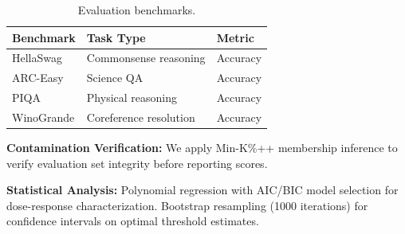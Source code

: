 \begin{table}[h]
\centering
\caption{Evaluation benchmarks.}
\label{tab:benchmarks}
\begin{tabular}{@{}lll@{}}
\toprule
Benchmark & Task Type & Metric \\
\midrule
HellaSwag & Commonsense reasoning & Accuracy \\
ARC-Easy & Science QA & Accuracy \\
PIQA & Physical reasoning & Accuracy \\
WinoGrande & Coreference resolution & Accuracy \\
\bottomrule
\end{tabular}
\end{table}

\textbf{Contamination Verification:} We apply Min-K\%++ \citep{shi2024minkpp} membership inference to verify evaluation set integrity before reporting scores.

\textbf{Statistical Analysis:} Polynomial regression with AIC/BIC model selection for dose-response characterization. Bootstrap resampling (1000 iterations) for confidence intervals on optimal threshold estimates.
